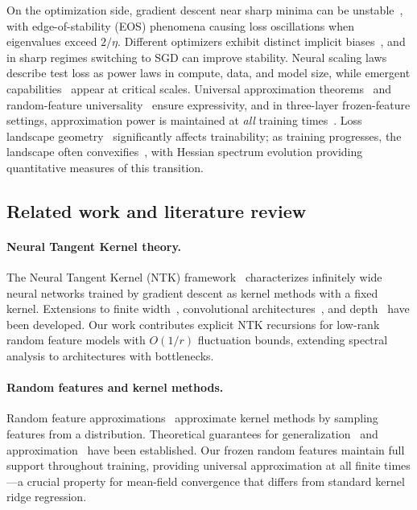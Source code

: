 \documentclass{article}
\begin{document}
On the optimization side, gradient descent near sharp minima can be unstable~\cite{cohen2021gradient}, with edge-of-stability (EOS) phenomena causing loss oscillations
 when eigenvalues exceed \( 2/\eta \). Different optimizers exhibit distinct implicit biases~\cite{wilson2017marginal}, and in sharp regimes switching to SGD can improve
  stability. Neural scaling laws~\cite{kaplan2020scaling,hoffmann2022training} describe test loss as power laws in compute, data, and model size, while emergent 
  capabilities~\cite{wei2022emergent} appear at critical scales. Universal approximation theorems~\cite{cybenko1989approximation,hornik1989multilayer} and random-feature
   universality~\cite{rahimi2008weighted} ensure expressivity, and in three-layer frozen-feature settings, approximation power is maintained at \emph{all} training
    times~\cite{nguyen2021proofglobalconvergencegradient}. Loss landscape geometry~\cite{li2018visualizing,fort2019large} significantly affects trainability; as training progresses, 
    the landscape often convexifies~\cite{chizat2020implicit}, with Hessian spectrum evolution providing quantitative measures of this transition.

\vspace{1em}
\subsection{Related work and literature review}

\paragraph{Neural Tangent Kernel theory.}
The Neural Tangent Kernel (NTK) framework~\cite{jacot2018neural} characterizes infinitely wide neural networks trained by gradient descent as kernel methods with a fixed kernel. Extensions to finite width~\cite{arora2019exact}, convolutional architectures~\cite{arora2019harnessing}, and depth~\cite{yang2019scaling,terjek2022depth} have been developed. Our work contributes explicit NTK recursions for low-rank random feature models with \( O(1/r) \) fluctuation bounds, extending spectral analysis to architectures with bottlenecks.

\paragraph{Random features and kernel methods.}
Random feature approximations~\cite{rahimi2007random} approximate kernel methods by sampling features from a distribution. Theoretical guarantees for generalization~\cite{bach2017breaking,rudi2017generalization} and approximation~\cite{sriperumbudur2015optimal} have been established. Our frozen random features maintain full support throughout training, providing universal approximation at all finite times—a crucial property for mean-field convergence that differs from standard kernel ridge regression.
\end{document}

